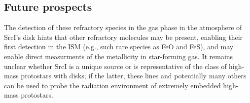 \documentclass[twocolumn]{aastex62}
\newcommand{\sourcei}{SrcI\xspace}
\begin{document}
\subsection{Future prospects}
The detection of these refractory species in the gas phase in the atmosphere
of \sourcei's disk hints that other refractory molecules may be present, 
enabling their first detection in the ISM (e.g., such rare species as FeO and FeS),
and may enable direct measurments of the metallicity in star-forming gas.
It remains unclear whether \sourcei is a unique source or is representative
of the class of high-mass protostars with disks; if the latter, these lines
and potentially many others can be used to probe the radiation environment of 
extremely embedded high-mass protostars.

%
\end{document}

